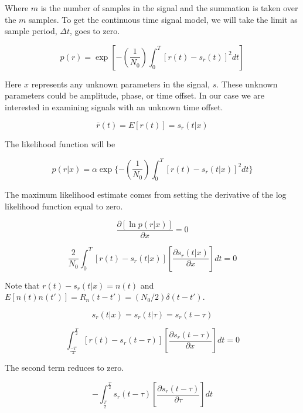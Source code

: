 \documentclass[11pt]{article}
\begin{document}
Where $m$ is the number of samples in the signal and the summation is taken over the $m$ samples. 
To get the continuous time signal model, we will take the limit as sample period, $\Delta t$, goes to zero.

\begin{equation}
p(r) = \exp \left[ -\left(\frac{1}{N_0}\right) \int^T_0 \left[ r(t) - s_r(t) \right]^2 dt \right]
\end{equation}

Here $x$ represents any unknown parameters in the signal, $s$. These unknown parameters could be amplitude, phase, or time offset. In our case we are interested in examining signals with an unknown time offset.

\begin{equation}
\bar{r}(t) = E[r(t)] = s_r(t|x)
\end{equation}

The likelihood function will be

\begin{equation}
p(r|x) 
=
\alpha \exp \{ - \left( \frac{1}{N_0} \right) \int^T_0 \left[ r(t) - s_r(t|x) \right]^2 dt \}
\end{equation}


The maximum likelihood estimate comes from setting the derivative of the log likelihood function equal to zero.

\begin{equation}
\frac{\partial \left[ \ln p(r|x) \right]}{\partial x}
= 0
\end{equation}

\begin{equation}
\frac{2}{N_0} \int^T_0 \left[ r(t) - s_r(t|x)\right]
\left[ \frac{\partial s_r(t|x)}{\partial x} \right] dt = 0
\end{equation}

Note that $r(t) - s_r(t|x) = n(t)$ and $E[n(t)n(t')]=R_n(t-t')=(N_0/2)\delta(t-t')$.

\begin{equation}
s_r(t|x) = s_r(t|\tau) = s_r(t-\tau)
\end{equation}


\begin{equation}
\int^\frac{T}{2}_\frac{-T}{2}
 \left[ r(t) - s_r(t-\tau)\right]
\left[ \frac{\partial s_r(t-\tau)}{\partial x} \right] dt = 0
\end{equation}

The second term reduces to zero.

\begin{equation}
- \int^\frac{T}{2}_\frac{T}{2}
s_r(t-\tau)
\left[ \frac{\partial s_r(t-\tau)}{\partial \tau} \right] dt
\end{equation}
\end{document}

